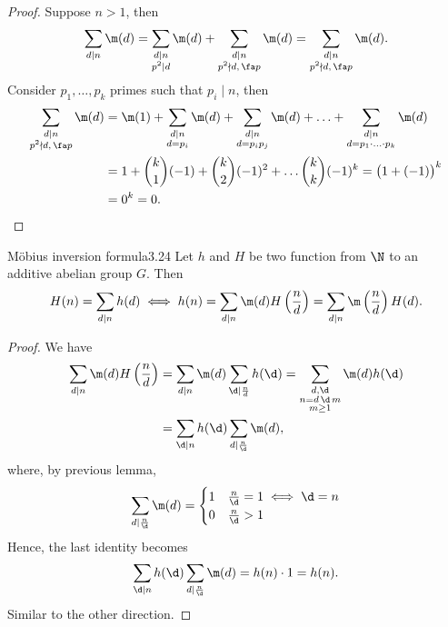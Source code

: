 \begin{proof}
	Suppose \(n>1\), then
	\[
		\sum_{d \mid n} \m(d) = \sum_{\substack{d \mid n\\p^2 \mid d}} \m(d) + \sum_{\substack{d \mid n\\p^2 \nmid d,\,\fa p}}\m(d) = \sum_{\substack{d \mid n\\p^2 \nmid d,\,\fa p}}\m(d).
	\]
	Consider \(p_1,\ldots,p_k\) primes such that \(p_i \mid n\), then
	\begin{align*}
		\sum_{\substack{d \mid n                                                                        \\p^2 \nmid d,\,\fa p}}\m(d) & = \m(1) + \sum_{\substack{d \mid n\\d = p_i}}\m(d) + \sum_{\substack{d \mid n\\d = p_i p_j}}\m(d) + \ldots + \sum_{\substack{d \mid n\\d = p_1 \cdot\ldots\cdot p_k}}\m(d)\\
		 & = 1 + \binom{k}{1}(-1) + \binom{k}{2}(-1)^2 + \ldots \binom{k}{k}(-1)^k = \big(1+(-1)\big)^k \\
		 & = 0^k = 0.\qedhere
	\end{align*}
\end{proof}

\begin{teor}{M\"obius inversion formula}{3.24}
	Let \(h\) and \(H\) be two function from \(\N\) to an additive abelian group \(G\). Then
	\[
		H(n) = \sum_{d \mid n}h(d) \iff h(n) = \sum_{d\mid n}\m(d) H\left(\frac{n}{d}\right) = \sum_{d\mid n}\m\left(\frac{n}{d}\right)H(d).
	\]
\end{teor}

\begin{proof}
	We have
	\begin{align*}
		\sum_{d\mid n}\m(d) H\left(\frac{n}{d}\right) & = \sum_{d \mid n}\m(d) \sum_{\d\mid \frac{n}{d}}h(\d) = \sum_{\substack{d,\d \\n=d\,\d\,m\\m \ge 1}}\m(d)h(\d)\\
		                                              & = \sum_{\d \mid n}h(\d)\sum_{d \mid \frac{n}{\d}}\m(d),
	\end{align*}
	where, by previous lemma,
	\[
		\sum_{d \mid \frac{n}{\d}}\m(d) =
		\begin{cases}
			1 & \frac{n}{\d}=1 \iff \d=n \\
			0 & \frac{n}{\d}>1
		\end{cases}
	\]
	Hence, the last identity becomes
	\[
		\sum_{\d \mid n}h(\d)\sum_{d \mid \frac{n}{\d}}\m(d) = h(n) \cdot 1 = h(n).
	\]
	Similar to the other direction.
\end{proof}

